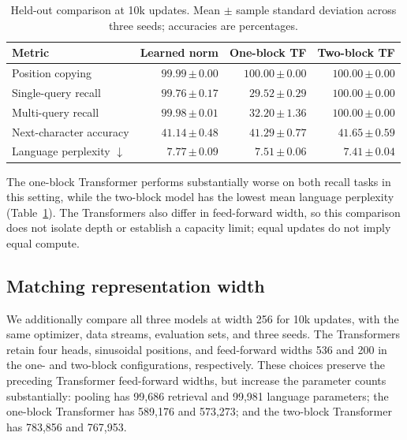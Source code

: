 \documentclass[11pt]{article}
\newcommand{\sd}[2]{#1\,{\scriptstyle\pm\,#2}}
\begin{document}
\begin{table}[htbp]
\centering\small
\caption{Held-out comparison at 10k updates. Mean \(\pm\) sample standard
deviation across three seeds; accuracies are percentages.}
\label{tab:one-block-comparison}
\begin{tabular}{lrrr}
\toprule
Metric & Learned norm & One-block TF & Two-block TF\\
\midrule
Position copying & \(\sd{99.99}{0.00}\) & \(\sd{100.00}{0.00}\) & \(\sd{100.00}{0.00}\)\\
Single-query recall & \(\sd{99.76}{0.17}\) & \(\sd{29.52}{0.29}\) & \(\sd{100.00}{0.00}\)\\
Multi-query recall & \(\sd{99.98}{0.01}\) & \(\sd{32.20}{1.36}\) & \(\sd{100.00}{0.00}\)\\
Next-character accuracy & \(\sd{41.14}{0.48}\) & \(\sd{41.29}{0.77}\) & \(\sd{41.65}{0.59}\)\\
Language perplexity \(\downarrow\) & \(\sd{7.77}{0.09}\) & \(\sd{7.51}{0.06}\) & \(\sd{7.41}{0.04}\)\\
\bottomrule
\end{tabular}
\end{table}

The one-block Transformer performs substantially worse on both recall tasks
in this setting, while the two-block model has the lowest mean language
perplexity (Table~\ref{tab:one-block-comparison}). The Transformers also
differ in feed-forward width, so this comparison does not isolate depth or
establish a capacity limit; equal updates do not imply equal compute.

\subsection{Matching representation width}
We additionally compare all three models at width 256 for 10k updates, with
the same optimizer, data streams, evaluation sets, and three seeds. The
Transformers retain four heads, sinusoidal positions, and feed-forward widths
536 and 200 in the one- and two-block configurations, respectively. These
choices preserve the preceding Transformer feed-forward widths, but increase
the parameter counts substantially: pooling has 99,686 retrieval and 99,981
language parameters; the one-block Transformer has 589,176 and 573,273; and
the two-block Transformer has 783,856 and 767,953.
\end{document}

